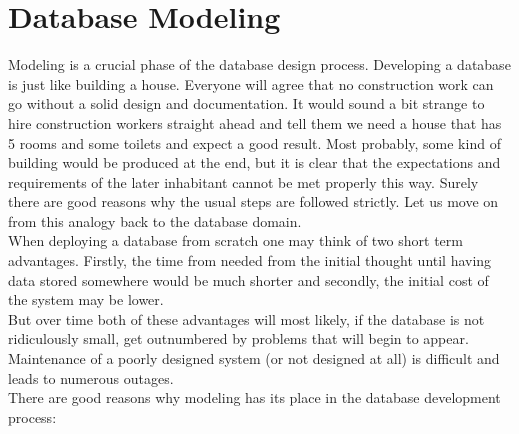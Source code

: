 \section{Database Modeling}
\label{chap:database_modeling}

Modeling is a crucial phase of the database design process.
Developing a database is just like building a house. 
Everyone will agree that no construction work can go without a solid design and documentation. 
It would sound a bit strange to hire construction workers straight ahead and tell them we need a house that has 5 rooms and some toilets and expect a good result. Most probably, some kind of building would be produced at the end, but it is clear that the expectations and requirements of the later inhabitant cannot be met properly this way.
Surely there are good reasons why the usual steps are followed strictly.
Let us move on from this analogy back to the database domain. \\
When deploying a database from scratch one may think of two short term advantages. Firstly, the time from needed from the initial thought until having data stored somewhere would be much shorter and secondly, the initial cost of the system may be lower. \\
But over time both of these advantages will most likely, if the database is not ridiculously small, get outnumbered by problems that will begin to appear. Maintenance of a poorly designed system (or not designed at all) is difficult and leads to numerous outages.\\

There are good reasons why modeling has its place in the database development process:


